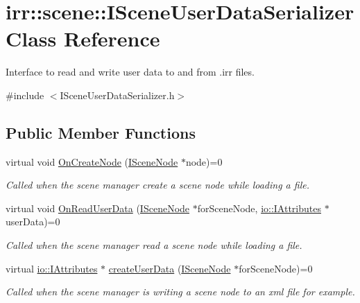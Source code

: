 \hypertarget{classirr_1_1scene_1_1ISceneUserDataSerializer}{}\section{irr\+:\+:scene\+:\+:I\+Scene\+User\+Data\+Serializer Class Reference}
\label{classirr_1_1scene_1_1ISceneUserDataSerializer}


Interface to read and write user data to and from .irr files.  




{\ttfamily \#include $<$I\+Scene\+User\+Data\+Serializer.\+h$>$}

\subsection*{Public Member Functions}
\begin{DoxyCompactItemize}
\item 
\mbox{\label{classirr_1_1scene_1_1ISceneUserDataSerializer_af025f0c9ee60be56d91f34bc9ab15115}} 
virtual void \hyperlink{classirr_1_1scene_1_1ISceneUserDataSerializer_af025f0c9ee60be56d91f34bc9ab15115}{On\+Create\+Node} (\hyperlink{classirr_1_1scene_1_1ISceneNode}{I\+Scene\+Node} $\ast$node)=0
\begin{DoxyCompactList}\small\item\em Called when the scene manager create a scene node while loading a file. \end{DoxyCompactList}\item 
virtual void \hyperlink{classirr_1_1scene_1_1ISceneUserDataSerializer_a48276bde0e05343d39ec25c6933f122d}{On\+Read\+User\+Data} (\hyperlink{classirr_1_1scene_1_1ISceneNode}{I\+Scene\+Node} $\ast$for\+Scene\+Node, \hyperlink{classirr_1_1io_1_1IAttributes}{io\+::\+I\+Attributes} $\ast$user\+Data)=0
\begin{DoxyCompactList}\small\item\em Called when the scene manager read a scene node while loading a file. \end{DoxyCompactList}\item 
virtual \hyperlink{classirr_1_1io_1_1IAttributes}{io\+::\+I\+Attributes} $\ast$ \hyperlink{classirr_1_1scene_1_1ISceneUserDataSerializer_a8d276882257602ffc03a23a38290ea44}{create\+User\+Data} (\hyperlink{classirr_1_1scene_1_1ISceneNode}{I\+Scene\+Node} $\ast$for\+Scene\+Node)=0
\begin{DoxyCompactList}\small\item\em Called when the scene manager is writing a scene node to an xml file for example. \end{DoxyCompactList}\end{DoxyCompactItemize}


